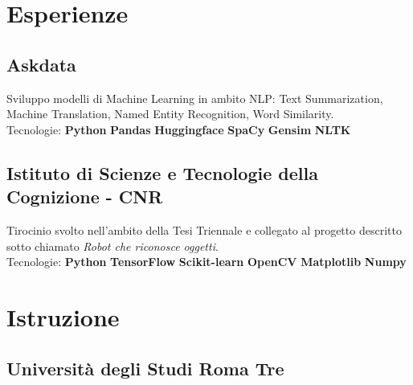 \documentclass[]{deedy-resume-openfont}
\begin{document}
\begin{minipage}[t]{0.66\textwidth} 


\section{Esperienze}

\subsection{Askdata}
Sviluppo modelli di Machine Learning in ambito NLP: Text Summarization, Machine Translation, Named Entity Recognition, Word Similarity. \\
Tecnologie: \textbf{Python} \textbullet{} \textbf{Pandas} \textbullet{} \textbf{Huggingface} \textbullet{} \textbf{SpaCy} \textbullet{} \textbf{Gensim} \textbullet{} \textbf{NLTK}
\sectionsep

\subsection{Istituto di Scienze e Tecnologie della Cognizione - CNR}
Tirocinio svolto nell'ambito della Tesi Triennale e collegato al progetto descritto sotto chiamato \textit{Robot che riconosce oggetti}. \\
Tecnologie: \textbf{Python} \textbullet{} \textbf{TensorFlow} \textbullet{} \textbf{Scikit-learn} \textbullet{} \textbf{OpenCV} \textbullet{} \textbf{Matplotlib} \textbullet{} \textbf{Numpy}
\sectionsep


\section{Istruzione} 

\subsection{Università degli Studi Roma Tre}
\sectionsep


\end{minipage}
\end{document}
